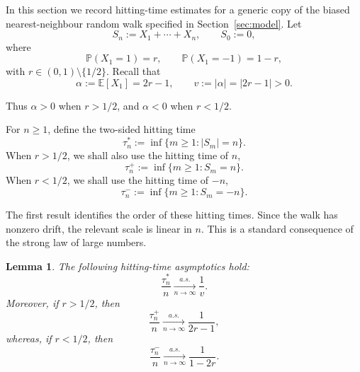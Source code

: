 \documentclass[reqno,final,11pt]{amsart}
\newcommand{\E}{\mathbb E}
\newcommand{\Pbb}{\mathbb P}
\theoremstyle{plain}
\newtheorem{lemma}[theorem]{Lemma}
\theoremstyle{definition}
\theoremstyle{remark}
\numberwithin{equation}{section}
\begin{document}
In this section we record hitting-time estimates for a generic copy of the
biased nearest-neighbour random walk specified in Section~\ref{sec:model}. Let
\[
  S_n:=X_1+\cdots+X_n,
  \qquad S_0:=0,
\]
where \[
  \Pbb(X_1=1)=r,
  \qquad
  \Pbb(X_1=-1)=1-r,
\]
with \(r\in(0,1)\setminus\{1/2\}\). Recall that
\[
  \alpha:=\E[X_1]=2r-1,
  \qquad
  v:=|\alpha|=|2r-1|>0.
\]


Thus \(\alpha>0\) when \(r>1/2\), and \(\alpha<0\) when \(r<1/2\).

For \(n\ge1\), define the two-sided hitting time
\[
  \tau_n^*:=\inf\{m\ge1: |S_m|=n\}.
\]
When \(r>1/2\), we shall also use the hitting time of \(n\),
\[
  \tau_n^+:=\inf\{m\ge1:S_m=n\}.
\]
When \(r<1/2\), we shall use the hitting time of \(-n\),
\[
  \tau_n^-:=\inf\{m\ge1:S_m=-n\}.
\]

The first result identifies the order of these hitting times. Since the walk
has nonzero drift, the relevant scale is linear in \(n\). This is a standard
consequence of the strong law of large numbers.


\begin{lemma}\label{lem:drifted-hitting-time}
The following hitting-time asymptotics hold:
\[
  \frac{\tau_n^*}{n}
  \xrightarrow[n\to\infty]{a.s.}
  \frac1v.
\]
Moreover, if \(r>1/2\), then
\[
  \frac{\tau_n^+}{n}
  \xrightarrow[n\to\infty]{a.s.}
  \frac1{2r-1},
\]
whereas, if \(r<1/2\), then
\[
  \frac{\tau_n^-}{n}
  \xrightarrow[n\to\infty]{a.s.}
  \frac1{1-2r}.
\]
\end{lemma}
\end{document}
